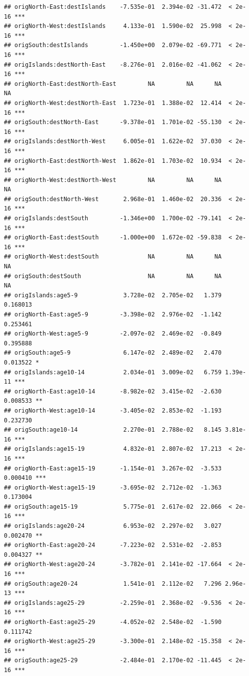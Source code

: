 \documentclass[
]{book}
\begin{document}
\begin{verbatim}
## origNorth-East:destIslands    -7.535e-01  2.394e-02 -31.472  < 2e-16 ***
## origNorth-West:destIslands     4.133e-01  1.590e-02  25.998  < 2e-16 ***
## origSouth:destIslands         -1.450e+00  2.079e-02 -69.771  < 2e-16 ***
## origIslands:destNorth-East    -8.276e-01  2.016e-02 -41.062  < 2e-16 ***
## origNorth-East:destNorth-East         NA         NA      NA       NA    
## origNorth-West:destNorth-East  1.723e-01  1.388e-02  12.414  < 2e-16 ***
## origSouth:destNorth-East      -9.378e-01  1.701e-02 -55.130  < 2e-16 ***
## origIslands:destNorth-West     6.005e-01  1.622e-02  37.030  < 2e-16 ***
## origNorth-East:destNorth-West  1.862e-01  1.703e-02  10.934  < 2e-16 ***
## origNorth-West:destNorth-West         NA         NA      NA       NA    
## origSouth:destNorth-West       2.968e-01  1.460e-02  20.336  < 2e-16 ***
## origIslands:destSouth         -1.346e+00  1.700e-02 -79.141  < 2e-16 ***
## origNorth-East:destSouth      -1.000e+00  1.672e-02 -59.838  < 2e-16 ***
## origNorth-West:destSouth              NA         NA      NA       NA    
## origSouth:destSouth                   NA         NA      NA       NA    
## origIslands:age5-9             3.728e-02  2.705e-02   1.379 0.168013    
## origNorth-East:age5-9         -3.398e-02  2.976e-02  -1.142 0.253461    
## origNorth-West:age5-9         -2.097e-02  2.469e-02  -0.849 0.395888    
## origSouth:age5-9               6.147e-02  2.489e-02   2.470 0.013522 *  
## origIslands:age10-14           2.034e-01  3.009e-02   6.759 1.39e-11 ***
## origNorth-East:age10-14       -8.982e-02  3.415e-02  -2.630 0.008533 ** 
## origNorth-West:age10-14       -3.405e-02  2.853e-02  -1.193 0.232730    
## origSouth:age10-14             2.270e-01  2.788e-02   8.145 3.81e-16 ***
## origIslands:age15-19           4.832e-01  2.807e-02  17.213  < 2e-16 ***
## origNorth-East:age15-19       -1.154e-01  3.267e-02  -3.533 0.000410 ***
## origNorth-West:age15-19       -3.695e-02  2.712e-02  -1.363 0.173004    
## origSouth:age15-19             5.775e-01  2.617e-02  22.066  < 2e-16 ***
## origIslands:age20-24           6.953e-02  2.297e-02   3.027 0.002470 ** 
## origNorth-East:age20-24       -7.223e-02  2.531e-02  -2.853 0.004327 ** 
## origNorth-West:age20-24       -3.782e-01  2.141e-02 -17.664  < 2e-16 ***
## origSouth:age20-24             1.541e-01  2.112e-02   7.296 2.96e-13 ***
## origIslands:age25-29          -2.259e-01  2.368e-02  -9.536  < 2e-16 ***
## origNorth-East:age25-29       -4.052e-02  2.548e-02  -1.590 0.111742    
## origNorth-West:age25-29       -3.300e-01  2.148e-02 -15.358  < 2e-16 ***
## origSouth:age25-29            -2.484e-01  2.170e-02 -11.445  < 2e-16 ***

\end{verbatim}
\end{document}
